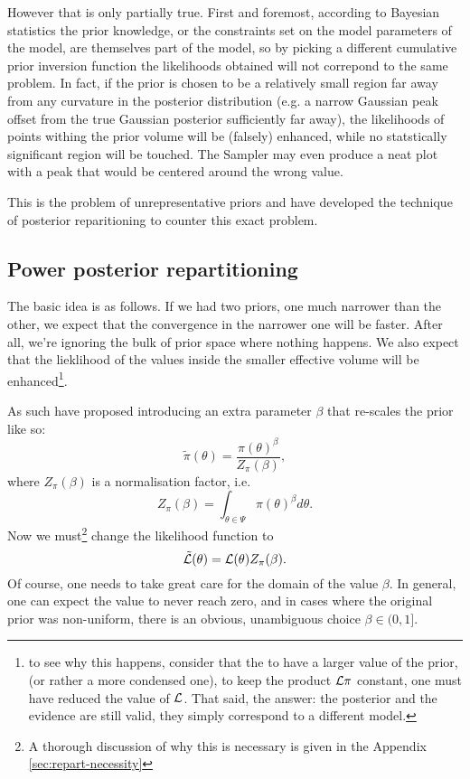 \documentclass[usenatbib]{mnras}
\begin{document}
However that is only partially true. First and foremost, according
to Bayesian statistics the prior knowledge, or the constraints set
on the model parameters of the model, are themselves part of the
model, so by picking a different cumulative prior inversion function the
likelihoods obtained will not correpond to the same problem. In
fact, if the prior is chosen to be a relatively small region far
away from any curvature in the posterior distribution (e.g. a
narrow Gaussian peak offset from the true Gaussian posterior
sufficiently far away), the likelihoods of points withing the prior
volume will be (falsely) enhanced, while no statstically
significant region will be touched. The Sampler may even produce a
neat plot with a peak that would be centered around the wrong
value.

This is the problem of unrepresentative priors and
\citeauthor*{chen-ferroz-hobson} have developed the technique of
posterior reparitioning to counter this exact problem.


\subsection{Power posterior repartitioning}
\label{sec:org15d7ceb}

The basic idea is as follows. If we had two priors, one much
narrower than the other, we expect that the convergence in the
narrower one will be faster. After all, we're ignoring the bulk of
prior space where nothing happens. We also expect that the
lieklihood of the values inside the smaller effective volume will
be enhanced\footnote{to see why this happens, consider that the to   have a larger value of the prior, (or rather a more condensed one),   to keep the product \(\cal L \pi\) constant, one must have reduced   the value of \(\cal L\). That said, the answer: the posterior and   the evidence are still valid, they simply correspond to a different  model.}. 

As such \citeauthor{chen-ferroz-hobson} have proposed introducing an
extra parameter \(\beta\) that re-scales the prior like so:
\begin{equation}
  \tilde{\pi}(\theta) = \frac{\pi(\theta)^{\beta}}{Z_{\pi}(\beta)},
\end{equation}
where \(Z_\pi(\beta)\) is a normalisation factor, i.e. 
\begin{equation}
  Z_{\pi}(\beta) = \int_{\theta \in \Psi} \pi(\theta)^{\beta}d\theta.
\end{equation}
Now we must\footnote{A thorough discussion of why this is necessary is given in the Appendix \autoref{sec:repart-necessity}} change the likelihood function to 
\begin{equation}
  \tilde{\cal L}(\theta) = {\cal L}(\theta) Z_{\pi}(\beta).
\end{equation}
Of course, one needs to take great care for the domain of the value
\(\beta\). In general, one can expect the value to never reach
zero, and in cases where the original prior was non-uniform, there
is an obvious, unambiguous choice \(\beta \in (0, 1]\). 
\end{document}
